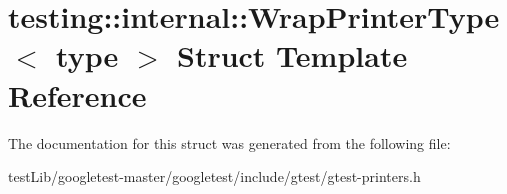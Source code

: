 \hypertarget{structtesting_1_1internal_1_1WrapPrinterType}{}\section{testing\+:\+:internal\+:\+:Wrap\+Printer\+Type$<$ type $>$ Struct Template Reference}
\label{structtesting_1_1internal_1_1WrapPrinterType}


The documentation for this struct was generated from the following file\+:\begin{DoxyCompactItemize}
\item 
test\+Lib/googletest-\/master/googletest/include/gtest/gtest-\/printers.\+h\end{DoxyCompactItemize}

